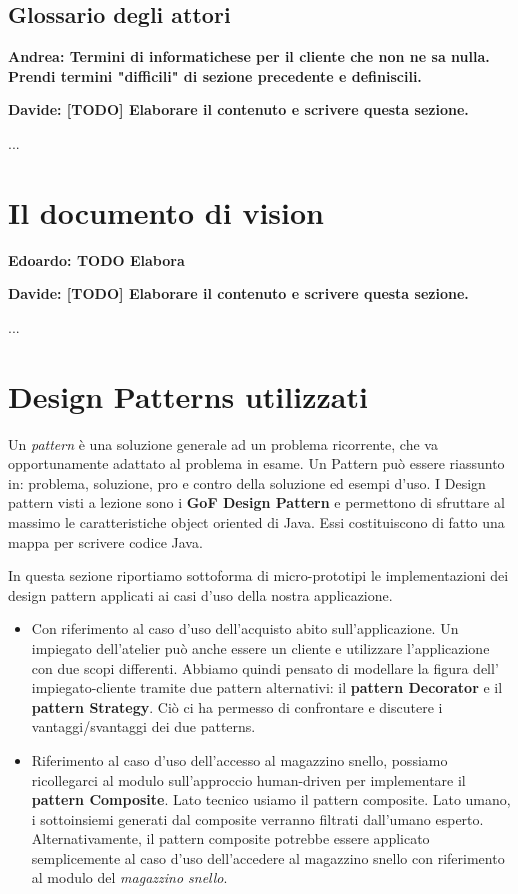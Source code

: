 \documentclass[12pt]{article}
\newcommand{\edoardo}[1]{{\bf \color{red} Edoardo: #1 }}
\newcommand{\andrea}[1]{{\bf \color{mauve} Andrea: #1 }}
\newcommand{\davide}[1]{{\bf \color{chromeyellow} Davide: #1 }}
\begin{document}
\subsection{Glossario degli attori}

\andrea{ Termini di informatichese per il cliente che non ne sa nulla. Prendi termini "difficili" di sezione precedente e definiscili.}

\davide{\textbf{[TODO]} Elaborare il contenuto e scrivere questa sezione.}

...


\section{Il documento di vision}

\edoardo{\textbf{TODO} Elabora}

\davide{\textbf{[TODO]} Elaborare il contenuto e scrivere questa sezione.}

...


\section{Design Patterns utilizzati}

Un {\em pattern} è una soluzione generale ad un problema ricorrente, che va opportunamente adattato al problema in esame. Un Pattern può essere riassunto in: problema, soluzione, pro e contro della soluzione ed esempi d’uso. I Design pattern visti a lezione sono i \textbf{GoF Design Pattern} e permettono di sfruttare al massimo le caratteristiche object oriented di Java. Essi costituiscono di fatto una mappa per scrivere codice Java.

In questa sezione riportiamo sottoforma di micro-prototipi le implementazioni dei design pattern applicati ai casi d'uso della nostra applicazione.

\begin{itemize}
    \item Con riferimento al caso d'uso dell'acquisto abito sull'applicazione. Un impiegato dell'atelier può anche essere un cliente e utilizzare l'applicazione con due scopi differenti.
    Abbiamo quindi pensato di modellare la figura dell' impiegato-cliente tramite due pattern alternativi: il \textbf{pattern Decorator} e il \textbf{pattern Strategy}. Ciò ci ha permesso di confrontare e discutere i vantaggi/svantaggi dei due patterns.
    \item Riferimento al caso d'uso dell'accesso al magazzino snello, possiamo ricollegarci al modulo sull'approccio human-driven per implementare il \textbf{pattern Composite}. Lato tecnico usiamo il pattern composite. Lato umano, i sottoinsiemi generati dal composite verranno filtrati dall'umano esperto.
    Alternativamente, il pattern composite potrebbe essere applicato semplicemente al caso d'uso dell'accedere al magazzino snello con riferimento al modulo del {\em magazzino snello}.
\end{itemize}
\end{document}
